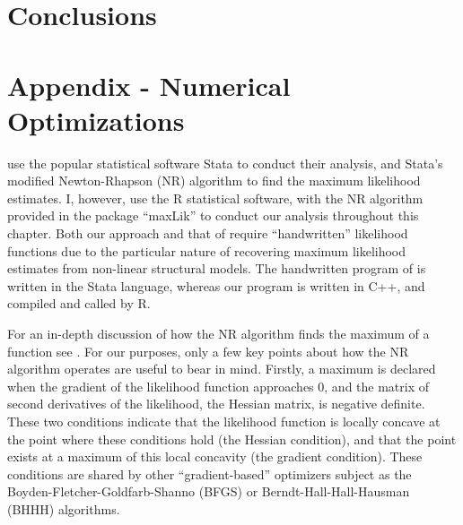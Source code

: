 \documentclass[../main.tex]{subfiles}
\begin{document}
\section{Conclusions}


\break
\section{Appendix - Numerical Optimizations}

\textcite{Harrison2016} use the popular statistical software Stata to conduct their analysis, and Stata's modified Newton-Rhapson (NR) algorithm to find the maximum likelihood estimates.
I, however, use the R statistical software, with the NR algorithm provided in the package \enquote{maxLik} to conduct our analysis throughout this chapter.
Both our approach and that of \textcite{Harrison2016} require \enquote{handwritten} likelihood functions due to the particular nature of recovering maximum likelihood estimates from non-linear structural models.
The handwritten program of \textcite{Harrison2016} is written in the Stata language, whereas our program is written in C++, and compiled and called by R.

For an in-depth discussion of how the NR algorithm finds the maximum of a function see \textcite[213-219]{Train2002}.
For our purposes, only a few key points about how the NR algorithm operates are useful to bear in mind.
Firstly, a maximum is declared when the gradient of the likelihood function approaches 0, and the matrix of second derivatives of the likelihood, the Hessian matrix, is negative definite.
These two conditions indicate that the likelihood function is locally concave at the point where these conditions hold (the Hessian condition), and that the point exists at a maximum of this local concavity (the gradient condition).
These conditions are shared by other \enquote{gradient-based} optimizers subject as the Boyden-Fletcher-Goldfarb-Shanno (BFGS) or Berndt-Hall-Hall-Hausman (BHHH) algorithms.
\end{document}
